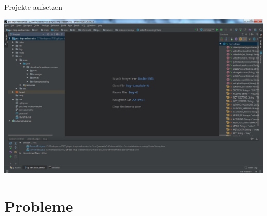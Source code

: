 \documentclass[19pt]{beamer}
\begin{document}
\begin{frame}{Projekte aufsetzen}
\begin{center}
\includegraphics[scale=0.3]{resources/Projekt.jpg}
\end{center}
\end{frame}

\section{Probleme}
\end{document}
